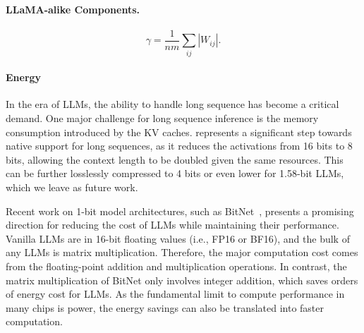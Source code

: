 \paragraph{LLaMA-alike Components.}

\begin{equation}
    \gamma = \frac{1}{nm}\sum_{ij} |W_{ij}|.
\end{equation}

\paragraph{Energy}

In the era of LLMs, the ability to handle long sequence has become a critical demand. One major challenge for long sequence inference is the memory consumption introduced by the KV caches.  represents a significant step towards native support for long sequences, as it reduces the activations from 16 bits to 8 bits, allowing the context length to be doubled given the same resources. This can be further losslessly compressed to 4 bits or even lower for 1.58-bit LLMs, which we leave as future work.

Recent work on 1-bit model architectures, such as BitNet~\cite{bitnet}, presents a promising direction for reducing the cost of LLMs while maintaining their performance. Vanilla LLMs are in 16-bit floating values (i.e., FP16 or BF16), and the bulk of any LLMs is matrix multiplication. Therefore, the major computation cost comes from the floating-point addition and multiplication operations. In contrast, the matrix multiplication of BitNet only involves integer addition, which saves orders of energy cost for LLMs. As the fundamental limit to compute performance in many chips is power, the energy savings can also be translated into faster computation.